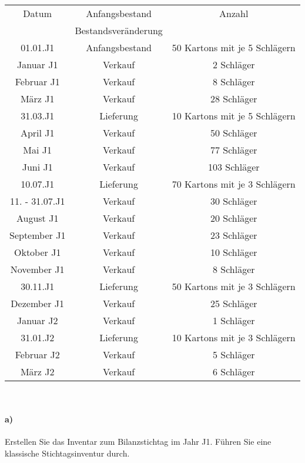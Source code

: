 \documentclass[paper=a4, fontsize=11pt]{scrartcl}
\numberwithin{equation}{section}
\numberwithin{figure}{section}
\numberwithin{table}{section}
\begin{document}
\begin{tabular}{c|c|c}
\hline
Datum & Anfangsbestand & Anzahl \\
          & Bestandsveränderung & \\
\hline
 01.01.J1 & Anfangsbestand & 50 Kartons mit je 5 Schlägern \\
 \hline
 Januar J1 & Verkauf & 2 Schläger \\
 \hline  
  Februar J1 & Verkauf & 8 Schläger \\
 \hline   
  März J1 & Verkauf & 28 Schläger \\
 \hline   
  31.03.J1 & Lieferung & 10 Kartons mit je 5 Schlägern \\
 \hline   
  April J1 & Verkauf & 50 Schläger \\
 \hline            
  Mai J1 & Verkauf & 77 Schläger \\
 \hline   
  Juni J1 & Verkauf & 103 Schläger \\
 \hline   
  10.07.J1 & Lieferung & 70 Kartons mit je 3 Schlägern \\
 \hline   
  11. - 31.07.J1 & Verkauf & 30 Schläger \\
 \hline   
  August J1 & Verkauf & 20 Schläger \\
 \hline  
  September J1 & Verkauf & 23 Schläger \\
 \hline   
  Oktober J1 & Verkauf & 10 Schläger \\
 \hline   
  November J1 & Verkauf & 8 Schläger \\
 \hline   
  30.11.J1 & Lieferung & 50 Kartons mit je 3 Schlägern \\
 \hline   
  Dezember J1 & Verkauf & 25 Schläger \\
 \hline  
  Januar J2 & Verkauf & 1 Schläger \\
 \hline   
  31.01.J2 & Lieferung & 10 Kartons mit je 3 Schlägern \\
 \hline   
  Februar J2 & Verkauf & 5 Schläger \\
 \hline   
  März J2 & Verkauf & 6 Schläger \\
 \hline   
\end{tabular} 
\\

\paragraph{a)}

Erstellen Sie das Inventar zum Bilanzstichtag im Jahr J1. Führen Sie eine klassische Stichtagsinventur durch. \\
\end{document}
